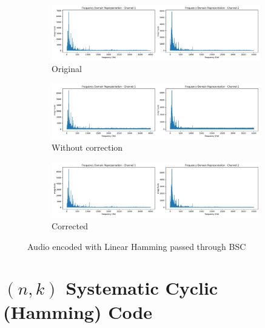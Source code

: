 \documentclass{article}
\begin{document}
\begin{figure}
    \centering
    \begin{subfigure}[b]{\textwidth}
        \centering
        \includegraphics[width=\textwidth]{../Result/wav-frequency-domain-TX.png}
        \caption{Original}
        \label{fig:f-audio-linear-bsc-original}
    \end{subfigure}
    \begin{subfigure}[b]{\textwidth}
        \centering
        \includegraphics[width=\textwidth]{../Result/linear-bsc-wav-frequency-domain-RX.png}
        \caption{Without correction}
        \label{fig:f-audio-linear-bsc-no-correction}
    \end{subfigure}
    \begin{subfigure}[b]{\textwidth}
        \centering
        \includegraphics[width=\textwidth]{../Result/linear-bsc-wav-frequency-domain-RX-syndrome-corrected.png}
        \caption{Corrected}
        \label{fig:f-audio-linear-bsc-syndrome-corrected}
    \end{subfigure}
       \caption{Audio encoded with Linear Hamming passed through BSC}
       \label{fig:f-audio-linear-bsc}
\end{figure}


\section{$(n,k)$ Systematic Cyclic (Hamming) Code}
\end{document}
